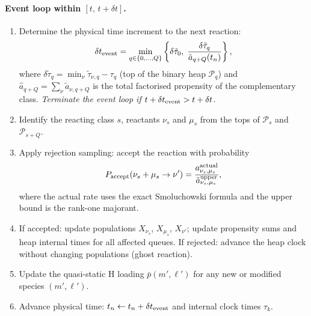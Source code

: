 \documentclass[pdflatex,sn-basic]{sn-jnl} %
\begin{document}
\paragraph{Event loop within $[t,\,t+\delta t]$.}
\begin{enumerate}
  \item Determine the physical time increment to the next reaction:
        \begin{equation}\label{eq:hybrid_dt}
            \delta t_{\rm event}
            = \min_{q \in \{0,\ldots,Q\}}
              \left\{
                \delta\tilde{\tau}_0,\;
                \frac{\delta\tilde{\tau}_q}{\hat{a}_{q+Q}(t_n)}
              \right\},
        \end{equation}
        where $\delta\tilde{\tau}_q = \min_\nu \tilde{\tau}_{\nu,q} -
        \tau_q$ (top of the binary heap $\mathcal{P}_q$) and
        $\hat{a}_{q+Q} = \sum_\nu \tilde{a}_{\nu,q+Q}$ is the
        total factorised propensity of the complementary class.
        \emph{Terminate the event loop if
        $t + \delta t_{\rm event} > t + \delta t$.}
  \item Identify the reacting class $s$, reactants $\nu_s$ and
        $\mu_s$ from the tops of $\mathcal{P}_s$ and
        $\mathcal{P}_{s+Q}$.
  \item Apply rejection sampling: accept the reaction with
        probability
        \begin{equation}\label{eq:accept_prob}
            P_{\rm accept}(\nu_s + \mu_s \to \nu')
            = \frac{a_{\nu_s,\mu_s}^{\rm actual}}
                   {\tilde{a}_{\nu_s,\mu_s}^{\rm upper}},
        \end{equation}
        where the actual rate uses the exact Smoluchowski formula
        and the upper bound is the rank-one majorant.
  \item If accepted: update populations
        $X_{\nu_s}$, $X_{\mu_s}$, $X_{\nu'}$; update propensity
        sums and heap internal times for all affected queues.
        If rejected: advance the heap clock without changing
        populations (ghost reaction).
  \item Update the quasi-static H loading $\bar{p}(m',\ell')$ for
        any new or modified species $(m',\ell')$.
  \item Advance physical time: $t_n \leftarrow t_n + \delta t_{\rm event}$
        and internal clock times $\tau_k$.
\end{enumerate}
\end{document}

